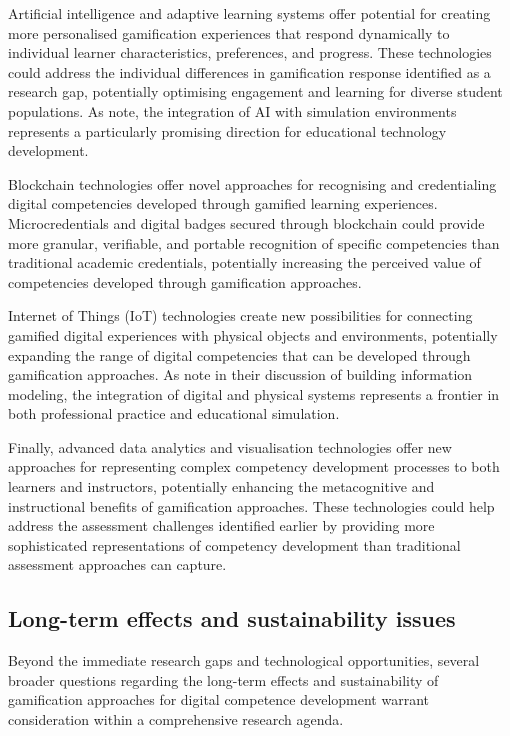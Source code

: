 \documentclass[cte]{acnsart}
\begin{document}
Artificial intelligence and adaptive learning systems offer potential for creating more personalised gamification experiences that respond dynamically to individual learner characteristics, preferences, and progress. These technologies could address the individual differences in gamification response identified as a research gap, potentially optimising engagement and learning for diverse student populations. As \citet{Wang2016319} note, the integration of AI with simulation environments represents a particularly promising direction for educational technology development.

Blockchain technologies offer novel approaches for recognising and credentialing digital competencies developed through gamified learning experiences. Microcredentials and digital badges secured through blockchain could provide more granular, verifiable, and portable recognition of specific competencies than traditional academic credentials, potentially increasing the perceived value of competencies developed through gamification approaches.

Internet of Things (IoT) technologies create new possibilities for connecting gamified digital experiences with physical objects and environments, potentially expanding the range of digital competencies that can be developed through gamification approaches. As \citet{Kivits2013} note in their discussion of building information modeling, the integration of digital and physical systems represents a frontier in both professional practice and educational simulation.

Finally, advanced data analytics and visualisation technologies offer new approaches for representing complex competency development processes to both learners and instructors, potentially enhancing the metacognitive and instructional benefits of gamification approaches. These technologies could help address the assessment challenges identified earlier by providing more sophisticated representations of competency development than traditional assessment approaches can capture.

\subsection{Long-term effects and sustainability issues}

Beyond the immediate research gaps and technological opportunities, several broader questions regarding the long-term effects and sustainability of gamification approaches for digital competence development warrant consideration within a comprehensive research agenda.
\end{document}
